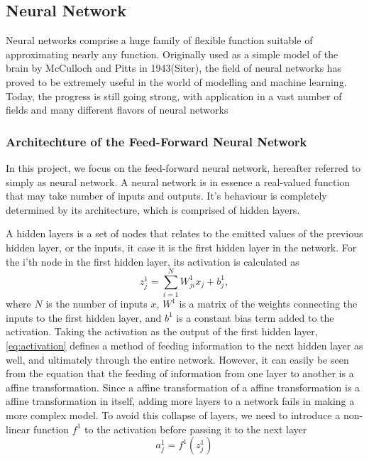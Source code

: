 \subsection{Neural Network}\label{sec:dnn theory}
Neural networks comprise a huge family of flexible function suitable of approximating nearly any function. Originally used as a simple model of the brain 
by McCulloch and Pitts in 1943(Siter), the field of neural networks has proved to be extremely useful in the world of modelling and machine learning. Today, the progress is still going strong, with application in a vast number of fields and many different flavors of neural networks

\subsubsection{Architechture of the Feed-Forward Neural Network}
In this project, we focus on the feed-forward neural network, hereafter referred
to simply as neural network. A neural network is in essence a real-valued function that may take number of inputs and outputs. It's behaviour is completely determined by its architecture, which is comprised of hidden layers.

A hidden layers is a set of nodes that relates to the emitted values of the 
previous hidden layer, or the inputs, it case it is the first hidden layer in the 
network. For the i'th node in the first hidden layer, its activation is 
calculated as
\begin{equation}\label{eq:activation}
    z^1_j = \sum_{i=1}^N W^1_{ji}x_j + b^1_j,
\end{equation}
where $N$ is the number of inputs $x$, $W^1$ is a matrix of the weights connecting the inputs to the first hidden layer, and $b^1$ is a constant bias term added to the activation. Taking the activation as the output of the first hidden layer, \autoref{eq:activation} defines a method of feeding information to the next hidden layer as well, and ultimately through the entire network. However, it can easily be seen from the equation that the feeding of information from one layer to another is a affine transformation. Since a affine transformation of a affine transformation is a affine transformation in itself, adding more layers to a network fails in making a more complex model. To avoid this collapse of 
layers, we need to introduce a non-linear function $f^1$ to the activation before 
passing it to the next layer
\begin{equation}\label{eq:non_linear}
    a^1_j = f^1(z^1_j)
\end{equation}


